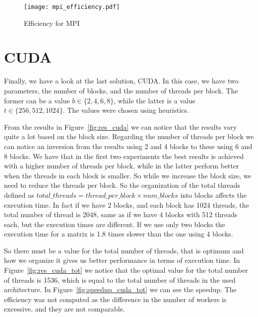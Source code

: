 \begin{figure}[H]
\centering
\texttt{[image: mpi\_efficiency.pdf]}
\caption{Efficiency for MPI}
\label{fig:efficiency_mpi}
\end{figure}

\section{CUDA}
Finally, we have a look at the last solution, CUDA. In this case, we have two parameters, the number of blocks, and the number of threads per block. The former can be a value $b \in \{2, 4, 6, 8\}$, while the latter is a value $t \in \{256, 512, 1024\}$. The values were chosen using heuristics.

From the results in Figure~\ref{fig:res_cuda} we can notice that the results vary quite a lot based on the block size. Regarding the number of threads per block we can notice an inversion from the results using 2 and 4 blocks to these using 6 and 8 blocks. We have that in the first two experiments the best results is achieved with a higher number of threads per block, while in the latter perform better when the threads in each block is smaller. So while we increase the block size, we need to reduce the threads per block. So the organization of the total threads defined as $total\_threads = thread\_per\_block \times num\_blocks$ into blocks affects the execution time. In fact if we have 2 blocks, and each block has 1024 threads, the total number of thread is 2048, same as if we have 4 blocks with 512 threads each, but the execution times are different. If we use only two blocks the execution time for a matrix is 1.8 times slower than the one using 4 blocks. 

So there must be a value for the total number of threads, that is optimum and how we organize it gives us better performance in terms of execution time. In Figure~\ref{fig:res_cuda_tot} we notice that the optimal value for the total number of threads is 1536, which is equal to the total number of threads in the used architecture. In Figure~\ref{fig:speedup_cuda_tot} we can see the speedup. The efficiency was not computed as the difference in the number of workers is excessive, and they are not comparable.

